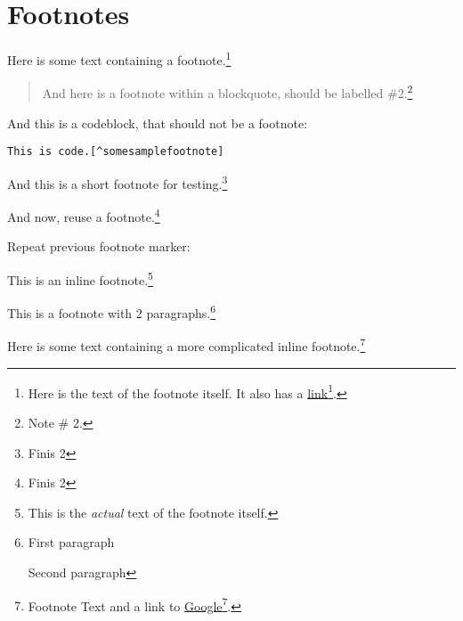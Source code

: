 
\def\mytitle{MultiMarkdown Footer Test}


\part{Footnotes}
\label{footnotes}

Here is some text containing a footnote.\footnote{Here is the text of the footnote itself. It also has a \href{http://somelink.com}{link}\footnote{\href{http://somelink.com}{http:/\slash somelink.com}}.}

\begin{quote}

And here is a footnote within a blockquote, should be labelled \#2.\footnote{Note \# 2.}
\end{quote}

And this is a codeblock, that should not be a footnote:

\begin{verbatim}
This is code.[^somesamplefootnote]
\end{verbatim}

And this is a short footnote for testing.\footnote{Finis 2}

And now, reuse a footnote.\footnote{Finis 2}

Repeat previous footnote marker:

This is an inline footnote.\footnote{This is the \emph{actual} text of the footnote itself.}

This is a footnote with 2 paragraphs.\footnote{First paragraph

Second paragraph}

Here is some text containing a more complicated inline footnote.\footnote{Footnote Text and
a link to \href{http://google.com}{Google}\footnote{\href{http://google.com}{http:/\slash google.com}}.}




